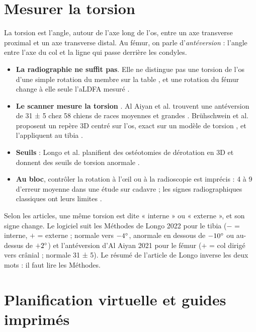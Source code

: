 \section{Mesurer la torsion}
\label{sec:etat-torsion}

La torsion est l'angle, autour de l'axe long de l'os, entre un axe transverse proximal et un axe transverse distal.
Au fémur, on parle d'\emph{antéversion} : l'angle entre l'axe du col et la ligne qui passe derrière les condyles.

\begin{itemize}
  \item \textbf{La radiographie ne suffit pas}. Elle ne distingue pas une torsion de l'os d'une simple rotation du
  membre sur la table \cite{apelt2005,aper2005}, et une rotation du fémur change à elle seule l'aLDFA mesuré
  \cite{miles2016}.
  \item \textbf{Le scanner mesure la torsion} \cite{dudley2006,mostafa2014}. Al Aiyan et al. trouvent une
  antéversion de 31 ± 5\degre{} chez 58 chiens de races moyennes et grandes \cite{alaiyan2021}. Brühschwein et al.
  proposent un repère 3D centré sur l'os, exact sur un modèle de torsion \cite{bruhschwein2023f}, et l'appliquent au
  tibia \cite{bruhschwein2023t}.
  \item \textbf{Seuils} : Longo et al. planifient des ostéotomies de dérotation en 3D et donnent des seuils de torsion
  anormale \cite{longo2022}.
  \item \textbf{Au bloc}, contrôler la rotation à l'œil ou à la radioscopie est imprécis : 4 à 9\degre{} d'erreur
  moyenne dans une étude sur cadavre \cite{ivanov2024} ; les signes radiographiques classiques ont leurs limites
  \cite{krettek1998,fang2015}.
\end{itemize}

\begin{attention}[title={Les conventions de signe varient}]
Selon les articles, une même torsion est dite « interne » ou « externe », et son signe change. Le logiciel suit les
Méthodes de Longo 2022 pour le tibia ($-$ = interne, $+$ = externe ; normale vers $-4^\circ$, anormale en dessous de
$-10^\circ$ ou au-dessus de $+2^\circ$) et l'antéversion d'Al Aiyan 2021 pour le fémur ($+$ = col dirigé vers
crânial ; normale 31 ± 5\degre). Le résumé de l'article de Longo inverse les deux mots : il faut lire les Méthodes.
\end{attention}

\section{Planification virtuelle et guides imprimés}
\label{sec:etat-guides}

